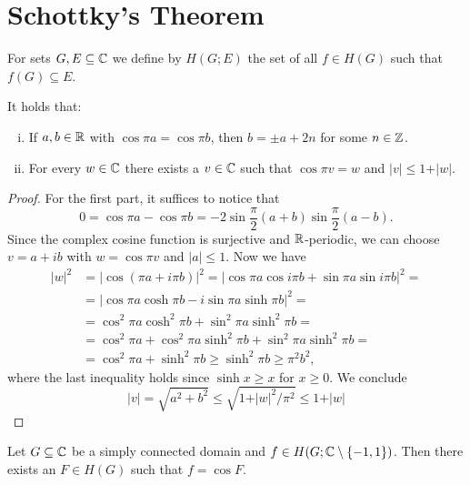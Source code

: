 \section{Schottky's Theorem}
\label{sec:schottkys-theorem}

For sets $G, E \subseteq \mathbb{C}$ we define by $H(G; E)$ the set of all $f \in H(G)$ such that $f(G) \subseteq E$.

\begin{lemma} \label{lem:schottky-1}
    It holds that:
    \begin{enumerate}[i.]
        \item If $a, b \in \mathbb{R}$ with $\cos \pi a = \cos \pi b$, then $b = \pm a + 2n$ for some $n \in \mathbb{Z}$.
        \item For every $w \in \mathbb{C}$ there exists a $v \in \mathbb{C}$ such that $\cos \pi v = w$ and $\vert v \vert \leq 1 + \vert w \vert$.
    \end{enumerate}
\end{lemma}

\begin{proof}
    For the first part, it suffices to notice that
    $$ 0 = \cos \pi a - \cos \pi b = \textstyle -2 \sin \frac{\pi}{2} ( a + b ) \sin \frac{\pi}{2} ( a - b ). $$
    Since the complex cosine function is surjective and $\mathbb{R}$-periodic, we can choose $v = a + i b$ with $w = \cos \pi v$ and $\vert a \vert \leq 1$. Now we have
    \begin{align*}
        \vert w \vert^2 &= \vert \cos (\pi a + i \pi b) \vert^2 = \vert \cos \pi a \cos i \pi b + \sin \pi a \sin i \pi b \vert^2 = \\
        &= \vert \cos \pi a \cosh \pi b - i \sin \pi a \sinh \pi b \vert^2 = \\
        &= \cos^2 \pi a \cosh^2 \pi b + \sin^2 \pi a \sinh^2 \pi b = \\
        &= \cos^2 \pi a + \cos^2 \pi a \sinh^2 \pi b + \sin^2 \pi a \sinh^2 \pi b = \\
        &= \cos^2 \pi a + \sinh^2 \pi b \geq \sinh^2 \pi b \geq \pi^2 b^2,
    \end{align*}
    where the last inequality holds since $\sinh x \geq x$ for $x \geq 0$. We conclude
    \begin{equation*}
        \vert v \vert = \sqrt{a^2 + b^2} \leq \sqrt{1 + \vert w \vert^2 / \pi^2} \leq 1 + \vert w \vert
    \end{equation*}
\end{proof}

\begin{lemma} \label{lem:schottky-2}
    Let $G \subseteq \mathbb{C}$ be a simply connected domain and $f \in H(G; \mathbb{C} \setminus \{ -1, 1 \})$. Then there exists an $F \in H(G)$ such that $f = \cos F$.
\end{lemma}

